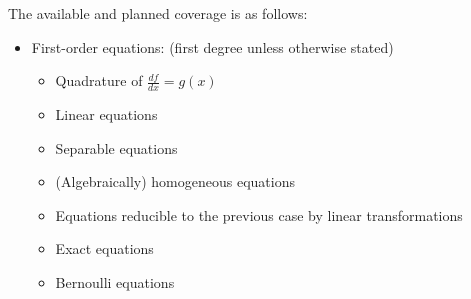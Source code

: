 The available and planned coverage is as follows:

\begin{itemize}
\item First-order equations: (first degree unless otherwise stated)

\begin{itemize}
\item Quadrature of $\frac{df}{dx} = g(x)$
\item Linear equations
\item Separable equations
\item (Algebraically) homogeneous equations
\item Equations reducible to the previous case by linear transformations
\item Exact equations
\item Bernoulli equations
\end{itemize}


\end{itemize}
